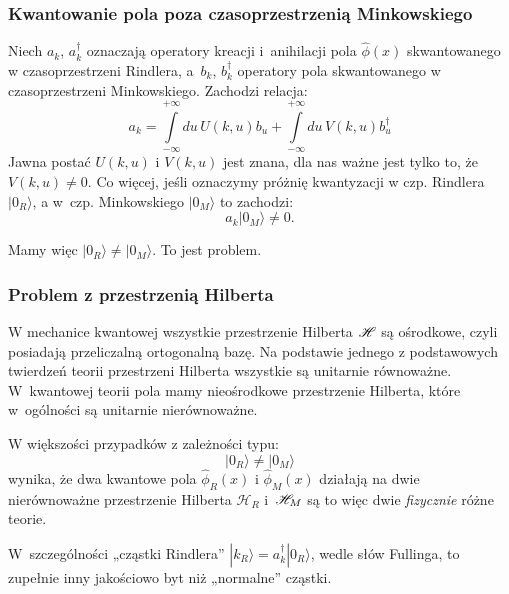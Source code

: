 \documentclass[10pt,t]{beamer}
\begin{document}
\begin{frame}
  \frametitle{Kwantowanie pola poza czasoprzestrzenią Minkowskiego}


  Niech $a_{ k }$, $a_{ k }^{ \dagger }$ oznaczają operatory kreacji
  i~anihilacji pola $\widehat{\phi}( x )$ skwantowanego w
  czasoprzestrzeni Rindlera, a~$b_{ k }$, $b_{ k }^{ \dagger }$
  operatory pola skwantowanego w czasoprzestrzeni Minkowskiego.
  Zachodzi relacja:
  \begin{equation}
    \label{eq:Promieniowanie-Hawkinga-08}
    a_{ k } =
    \int\limits_{ -\infty }^{ +\infty } du \, U( k, u ) b_{ u }
    + \int\limits_{ -\infty }^{ +\infty } du \, V( k, u ) b_{ u }^{ \dagger }
  \end{equation}
  Jawna postać $U( k, u )$ i $V( k, u )$ jest znana, dla nas ważne
  jest tylko to, że $V( k, u ) \neq 0$. Co więcej, jeśli oznaczymy
  próżnię kwantyzacji w czp. Rindlera $| 0_{ R } \rangle$, a w~czp. Minkowskiego
  $| 0_{ M } \rangle$ to zachodzi:
  \begin{equation}
    \label{eq:Promieniowanie-Hawkinga-09}
    a_{ k } | 0_{ M } \rangle \neq 0.
  \end{equation}

  Mamy więc $| 0_{ R } \rangle \neq | 0_{ M } \rangle$. To jest problem.

\end{frame}





\begin{frame}
  \frametitle{Problem z przestrzenią Hilberta}


  W mechanice kwantowej wszystkie przestrzenie Hilberta $\mathcal{H}$
  są ośrodkowe, czyli posiadają przeliczalną ortogonalną bazę. Na
  podstawie jednego z podstawowych twierdzeń teorii przestrzeni
  Hilberta wszystkie są unitarnie równoważne. W~kwantowej teorii pola
  mamy nieośrodkowe przestrzenie Hilberta, które w~ogólności są
  unitarnie nierównoważne.

  W większości przypadków z zależności typu:
  \begin{equation}
    \label{eq:Promieniowanie-Hawkinga-10}
    | 0_{ R } \rangle \neq | 0_{ M } \rangle
  \end{equation}
  wynika, że dwa kwantowe pola $\widehat{\phi}_{ R }( x )$ i
  $\widehat{\phi}_{ M }( x )$ działają na dwie nierównoważne
  przestrzenie Hilberta $\mathcal{H}_{ R }$ i~$\mathcal{H}_{ M }$ są
  to więc dwie \textit{fizycznie} różne teorie.

  W~szczególności „cząstki Rindlera”
  $| k_{ R } \rangle = a_{ k }^{ \dagger } | 0_{ R } \rangle$, wedle
  słów Fullinga, to zupełnie inny jakościowo byt niż „normalne”
  cząstki.

\end{frame}
\end{document}
